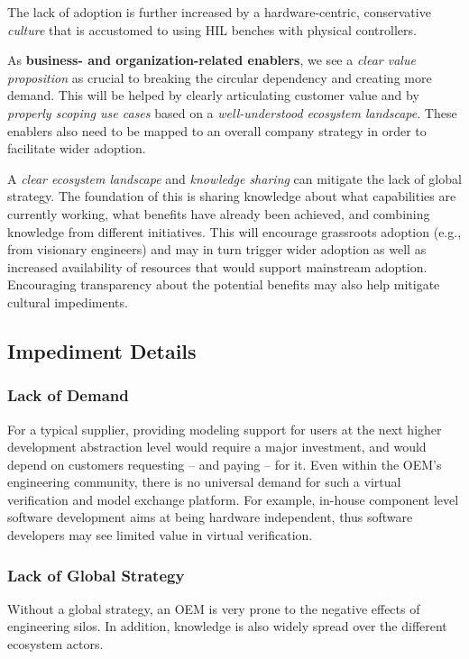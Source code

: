 The lack of adoption is further increased by a hardware-centric, conservative \emph{culture} that is accustomed to using HIL benches with physical controllers.

As \textbf{business- and organization-related enablers}, %
we see a \emph{clear value proposition} as crucial to breaking the circular dependency and creating more demand.
This will be helped by clearly articulating customer value and by \emph{properly scoping use cases} based on a \emph{well-understood ecosystem landscape}.
These enablers also need to be mapped to an overall company strategy in order to facilitate wider adoption. 

A \emph{clear ecosystem landscape} and \emph{knowledge sharing} can mitigate the lack of global strategy.
The foundation of this is sharing knowledge about what capabilities are currently working, what benefits have already been achieved, and combining knowledge from different initiatives.
This will encourage grassroots adoption (e.g., from visionary engineers) and may in turn trigger wider adoption
as well as increased availability of resources that would support mainstream adoption. Encouraging transparency about the potential benefits may also help mitigate cultural impediments.

\subsection{Impediment Details}
\subsubsection*{Lack of Demand}
For a typical supplier,
providing modeling support for users at the next higher development abstraction level would require a major investment,
and would depend on customers requesting -- and paying -- for it.
%
Even within the OEM's engineering community, there is no universal demand
for such a virtual verification and model exchange platform.
For example, in-house component level software development aims at being hardware independent, thus software developers may see limited value in virtual verification.


\subsubsection*{Lack of Global Strategy}
Without a global strategy, an OEM is very prone to the negative effects of engineering silos.
In addition, knowledge is also widely spread over the different ecosystem actors.

